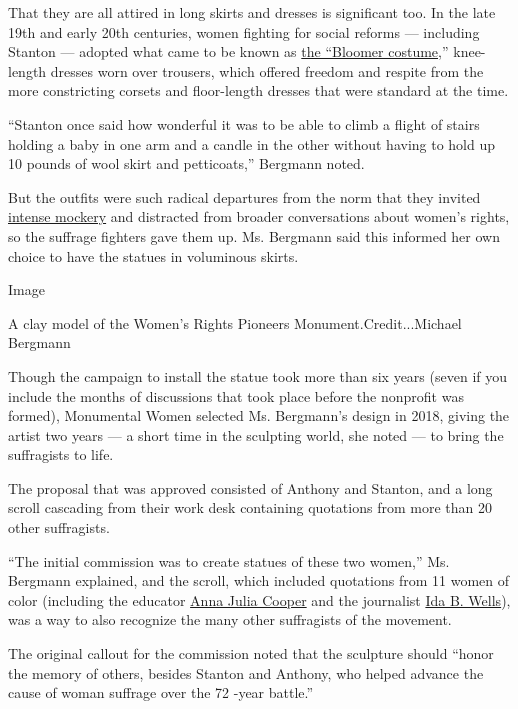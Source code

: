 That they are all attired in long skirts and dresses is significant too.
In the late 19th and early 20th centuries, women fighting for social
reforms --- including Stanton --- adopted what came to be known as
\href{https://www.nytimes.com/1939/12/31/archives/bloomer-and-she-was-a-feminist-not-a-fashion-designee.html}{the
``Bloomer costume,}'' knee-length dresses worn over trousers, which
offered freedom and respite from the more constricting corsets and
floor-length dresses that were standard at the time.

``Stanton once said how wonderful it was to be able to climb a flight of
stairs holding a baby in one arm and a candle in the other without
having to hold up 10 pounds of wool skirt and petticoats,'' Bergmann
noted.

But the outfits were such radical departures from the norm that they
invited
\href{https://www.theatlantic.com/entertainment/archive/2019/06/american-suffragists-bloomers-pants-history/591484/}{intense
mockery} and distracted from broader conversations about women's rights,
so the suffrage fighters gave them up. Ms. Bergmann said this informed
her own choice to have the statues in voluminous skirts.

Image

A clay model of the Women's Rights Pioneers Monument.Credit...Michael
Bergmann

Though the campaign to install the statue took more than six years
(seven if you include the months of discussions that took place before
the nonprofit was formed), Monumental Women selected Ms. Bergmann's
design in 2018, giving the artist two years --- a short time in the
sculpting world, she noted --- to bring the suffragists to life.

The proposal that was approved consisted of Anthony and Stanton, and a
long scroll cascading from their work desk containing quotations from
more than 20 other suffragists.

``The initial commission was to create statues of these two women,'' Ms.
Bergmann explained, and the scroll, which included quotations from 11
women of color (including the educator
\href{https://plato.stanford.edu/entries/anna-julia-cooper/}{Anna Julia
Cooper} and the journalist
\href{https://www.nytimes.com/interactive/2018/obituaries/overlooked-ida-b-wells.html}{Ida
B. Wells}), was a way to also recognize the many other suffragists of
the movement.

The original callout for the commission noted that the sculpture should
``honor the memory of others, besides Stanton and Anthony, who helped
advance the cause of woman suffrage over the 72 -year battle.''

